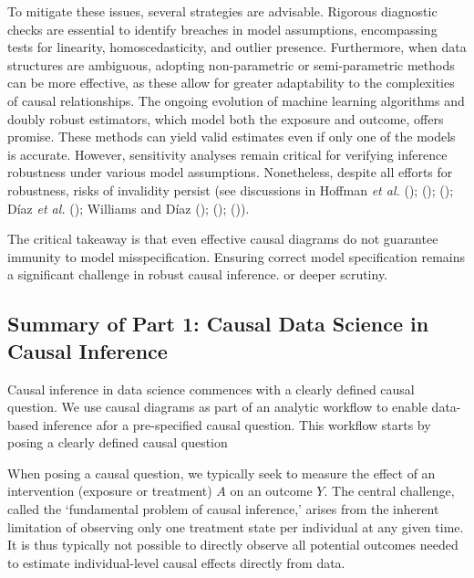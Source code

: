 \documentclass[
  singlecolumn,
  9pt]{article}
\begin{document}
To mitigate these issues, several strategies are advisable. Rigorous
diagnostic checks are essential to identify breaches in model
assumptions, encompassing tests for linearity, homoscedasticity, and
outlier presence. Furthermore, when data structures are ambiguous,
adopting non-parametric or semi-parametric methods can be more
effective, as these allow for greater adaptability to the complexities
of causal relationships. The ongoing evolution of machine learning
algorithms and doubly robust estimators, which model both the exposure
and outcome, offers promise. These methods can yield valid estimates
even if only one of the models is accurate. However, sensitivity
analyses remain critical for verifying inference robustness under
various model assumptions. Nonetheless, despite all efforts for
robustness, risks of invalidity persist (see discussions in Hoffman
\emph{et al.} ();
();
(); Díaz \emph{et al.}
(); Williams and Díaz
();
();
()).

The critical takeaway is that even effective causal diagrams do not
guarantee immunity to model misspecification. Ensuring correct model
specification remains a significant challenge in robust causal
inference. or deeper scrutiny.

\subsection{Summary of Part 1: Causal Data Science in Causal
Inference}\label{summary-of-part-1-causal-data-science-in-causal-inference}

Causal inference in data science commences with a clearly defined causal
question. We use causal diagrams as part of an analytic workflow to
enable data-based inference afor a pre-specified causal question. This
workflow starts by posing a clearly defined causal question

When posing a causal question, we typically seek to measure the effect
of an intervention (exposure or treatment) \(A\) on an outcome \(Y\).
The central challenge, called the `fundamental problem of causal
inference,' arises from the inherent limitation of observing only one
treatment state per individual at any given time. It is thus typically
not possible to directly observe all potential outcomes needed to
estimate individual-level causal effects directly from data.
\end{document}
